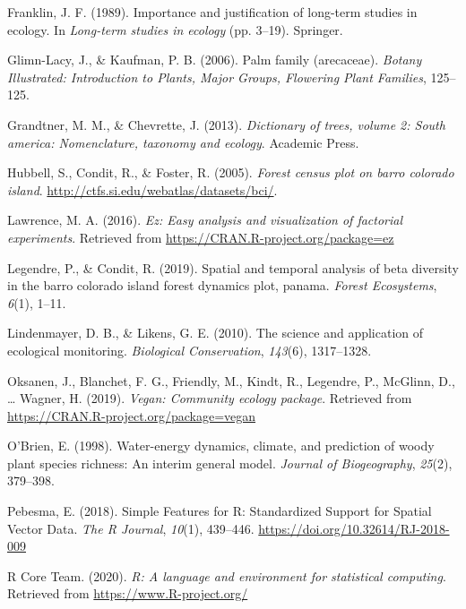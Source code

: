 \documentclass[11pt,]{article}
\begin{document}
\hypertarget{ref-franklin1989importance}{}
Franklin, J. F. (1989). Importance and justification of long-term
studies in ecology. In \emph{Long-term studies in ecology} (pp. 3--19).
Springer.

\hypertarget{ref-glimn2006palm}{}
Glimn-Lacy, J., \& Kaufman, P. B. (2006). Palm family (arecaceae).
\emph{Botany Illustrated: Introduction to Plants, Major Groups,
Flowering Plant Families}, 125--125.

\hypertarget{ref-grandtner2013dictionary}{}
Grandtner, M. M., \& Chevrette, J. (2013). \emph{Dictionary of trees,
volume 2: South america: Nomenclature, taxonomy and ecology}. Academic
Press.

\hypertarget{ref-Hubbell2005Barro}{}
Hubbell, S., Condit, R., \& Foster, R. (2005). \emph{Forest census plot
on barro colorado island}.
\url{http://ctfs.si.edu/webatlas/datasets/bci/}.

\hypertarget{ref-EZ}{}
Lawrence, M. A. (2016). \emph{Ez: Easy analysis and visualization of
factorial experiments}. Retrieved from
\url{https://CRAN.R-project.org/package=ez}

\hypertarget{ref-legendre2019spatial}{}
Legendre, P., \& Condit, R. (2019). Spatial and temporal analysis of
beta diversity in the barro colorado island forest dynamics plot,
panama. \emph{Forest Ecosystems}, \emph{6}(1), 1--11.

\hypertarget{ref-lindenmayer2010science}{}
Lindenmayer, D. B., \& Likens, G. E. (2010). The science and application
of ecological monitoring. \emph{Biological Conservation}, \emph{143}(6),
1317--1328.

\hypertarget{ref-VeganPack}{}
Oksanen, J., Blanchet, F. G., Friendly, M., Kindt, R., Legendre, P.,
McGlinn, D., \ldots{} Wagner, H. (2019). \emph{Vegan: Community ecology
package}. Retrieved from \url{https://CRAN.R-project.org/package=vegan}

\hypertarget{ref-o1998water}{}
O'Brien, E. (1998). Water-energy dynamics, climate, and prediction of
woody plant species richness: An interim general model. \emph{Journal of
Biogeography}, \emph{25}(2), 379--398.

\hypertarget{ref-sfpackage}{}
Pebesma, E. (2018). Simple Features for R: Standardized Support for
Spatial Vector Data. \emph{The R Journal}, \emph{10}(1), 439--446.
\url{https://doi.org/10.32614/RJ-2018-009}

\hypertarget{ref-RSoft}{}
R Core Team. (2020). \emph{R: A language and environment for statistical
computing}. Retrieved from \url{https://www.R-project.org/}
\end{document}

